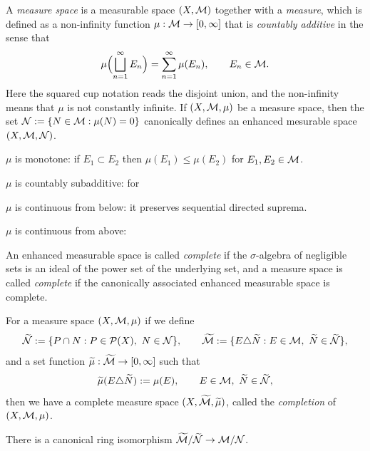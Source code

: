 \documentclass{../../large}
\begin{document}
\begin{prb}
A \emph{measure space} is a measurable space $(X,\mathcal{M})$ together with a \emph{measure}, which is defined as a non-infinity function $\mu:\mathcal{M}\to[0,\infty]$ that is \emph{countably additive} in the sense that
\[\mu\Bigl(\bigsqcup_{n=1}^\infty E_n\Bigr)=\sum_{n=1}^\infty\mu(E_n),\qquad E_n\in\mathcal{M}.\]
Here the squared cup notation reads the disjoint union, and the non-infinity means that $\mu$ is not constantly infinite.
If $(X,\mathcal{M},\mu)$ be a measure space, then the set $\mathcal{N}:=\{N\in\mathcal{M}:\mu(N)=0\}$ canonically defines an enhanced mesurable space $(X,\mathcal{M},\mathcal{N})$.
\begin{parts}
\item $\mu$ is monotone: if $E_1\subset E_2$ then $\mu(E_1)\le\mu(E_2)$ for $E_1,E_2\in\mathcal{M}$.
\item $\mu$ is countably subadditive: for
\item $\mu$ is continuous from below: it preserves sequential directed suprema.
\item $\mu$ is continuous from above:
\end{parts}
\end{prb}
\begin{pf}

\end{pf}


\begin{prb}
An enhanced measurable space is called \emph{complete} if the $\sigma$-algebra of negligible sets is an ideal of the power set of the underlying set, and a measure space is called \emph{complete} if the canonically associated enhanced measurable space is complete.

For a measure space $(X,\mathcal{M},\mu)$ if we define
\[\tilde\cN:=\{P\cap N:P\in\cP(X),\ N\in\cN\},\qquad\tilde\cM:=\{E\triangle\tilde N:E\in\cM,\ \tilde N\in\tilde\cN\},\]
and a set function $\widetilde\mu:\widetilde{\mathcal{M}}\to[0,\infty]$ such that
\[\widetilde\mu(E\triangle\widetilde N):=\mu(E),\qquad E\in\mathcal{M},\ \widetilde N\in\widetilde{\mathcal{N}},\]
then we have a complete measure space $(X,\widetilde{\mathcal{M}},\widetilde\mu)$, called the \emph{completion} of $(X,\mathcal{M},\mu)$.
\begin{parts}
\item There is a canonical ring isomorphism $\widetilde{\mathcal{M}}/\widetilde{\mathcal{N}}\to\mathcal{M}/\mathcal{N}$.
\end{parts}
\end{prb}
\end{document}
